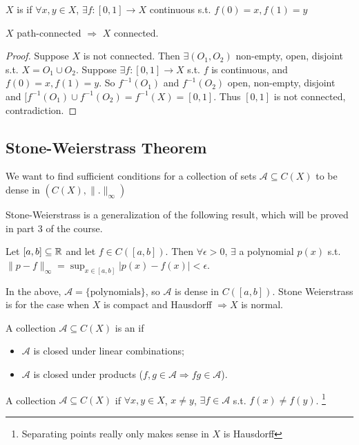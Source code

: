 \begin{defn} 
    $X$ is  if $\forall x, y \in X$, $\exists f : [0, 1] \to X$ continuous
    s.t. $f(0) = x, f(1) = y$    
\end{defn}

\begin{prop}
    $X$ path-connected $\Rightarrow$ $X$ connected.
\end{prop}

\begin{proof}
    Suppose $X$ is not connected. Then $\exists (O_1, O_2)$ non-empty, open, disjoint s.t.
    $X = O_1 \cup O_2$. Suppose $\exists f : [0, 1] \to X$ s.t. $f$ is continuous, and 
    $f(0) = x, f(1) = y$. So $f^{-1}(O_1)$ and $f^{-1}(O_2)$ open, non-empty, disjoint and
    $[f^{-1}(O_1) \cup f^{-1}(O_2) = f^{-1}(X) = [0, 1]$. Thus $[0, 1]$ is not connected, contradiction. \qedhere       
\end{proof}

\subsection{Stone-Weierstrass Theorem}
\begin{goal}
    We want to find sufficient conditions for a collection of sets $\mathcal{A} \subseteq C(X)$ to be 
    dense in $(C(X), \| . \|_{\infty} )$  
\end{goal}

Stone-Weierstrass is a generalization of the following result, which will be proved in part 3 of the course.

\begin{thm}
    Let $[a, b] \subseteq \mathbb{R}$ and let $f \in C([a, b])$. Then $\forall \epsilon > 0$, 
    $\exists $ a polynomial $p(x)$ s.t. $\| p - f \|_{\infty} = \sup_{x \in [a,b]} |p(x) - f(x)| < \epsilon$.     
\end{thm}

In the above, $\mathcal{A} = \{ \text{polynomials} \}$, so $\mathcal{A}$ is dense in $C([a, b])$.
Stone Weierstrass is for the case when $X$ is compact and Hausdorff $\Rightarrow X$ is normal.

\begin{defn}
    A collection $\mathcal{A} \subseteq C(X)$ is an  if 
    \begin{itemize}
        \item $\mathcal{A}$ is closed under linear combinations;
        \item $\mathcal{A}$ is closed under products ($f, g \in \mathcal{A} \Rightarrow fg \in \mathcal{A}$).  
    \end{itemize} 

    A collection $\mathcal{A} \subseteq C(X)$  if $\forall x, y \in X$, $x \neq y$, 
    $\exists f \in \mathcal{A}$ s.t. $f(x) \neq f(y)$. \footnote{Separating points really only makes sense in $X$ is Hausdorff}
\end{defn}


